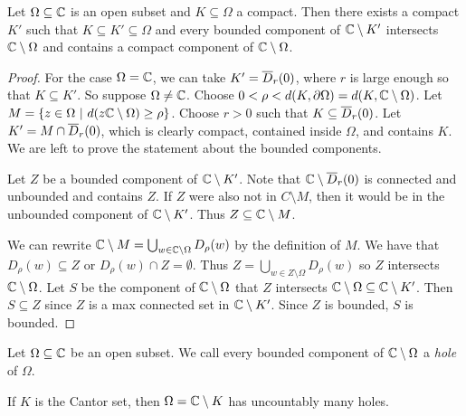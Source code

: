 \begin{lema}
    Let $\Omega \subseteq \mathbb{C}$ is an open subset and $K \subseteq \Omega$ a compact. Then there exists a compact $K'$ such that $K \subseteq K' \subseteq \Omega$ and every bounded component of $\mathbb{C} \setminus K'$ intersects $\mathbb{C} \setminus \Omega$ and contains a compact component of $\mathbb{C} \setminus \Omega$.
\end{lema}
\begin{proof}
    For the case $\Omega = \mathbb{C}$, we can take $K' = \overline{D}_r(0)$, where $r$ is large enough so that $K \subseteq K'$. So suppose $\Omega \neq \mathbb{C}$. Choose $0 < \rho < d(K, \partial{\Omega}) = d(K, \mathbb{C} \setminus \Omega)$. Let $M = \left\{z \in \Omega~\middle\vert~d(z \mathbb{C} \setminus \Omega) \geq \rho\right\}$. Choose $r > 0$ such that $K \subseteq \overline{D}_r(0)$. Let $K' = M \cap \overline{D}_r(0)$, which is clearly compact, contained inside $\Omega$, and contains $K$. We are left to prove the statement about the bounded components.

    Let $Z$ be a bounded component of $\mathbb{C} \setminus K'$. Note that $\mathbb{C} \setminus \overline{D}_r(0)$ is connected and unbounded and contains $Z$. If $Z$ were also not in $C \setminus M$, then it would be in the unbounded component of $\mathbb{C} \setminus K'$. Thus $Z \subseteq \mathbb{C} \setminus M$.  

    We can rewrite $\mathbb{C} \setminus M = \bigcup_{w \in \mathbb{C} \setminus \Omega} D_{\rho}(w)$ by the definition of $M$. We have that  $D_{\rho}(w) \subseteq Z$ or $D_{\rho}(w) \cap Z = \emptyset$. Thus $Z = \bigcup_{w \in Z \setminus \Omega} D_{\rho}(w)$ so $Z$ intersects $\mathbb{C} \setminus \Omega$. Let $S$ be the component of $\mathbb{C} \setminus \Omega$ that $Z$ intersects $\mathbb{C} \setminus \Omega \subseteq \mathbb{C} \setminus K'$. Then $S \subseteq Z$ since $Z$ is a max connected set in $\mathbb{C} \setminus K'$. Since $Z$ is bounded, $S$ is bounded.
\end{proof}

\begin{definicija}
    Let $\Omega \subseteq \mathbb{C}$ be an open subset. We call every bounded component of $\mathbb{C} \setminus \Omega$ a \emph{hole} of $\Omega$.
\end{definicija}

\begin{opomba}
    If $K$ is the Cantor set, then $\Omega = \mathbb{C} \setminus K$ has uncountably many holes.
\end{opomba}

